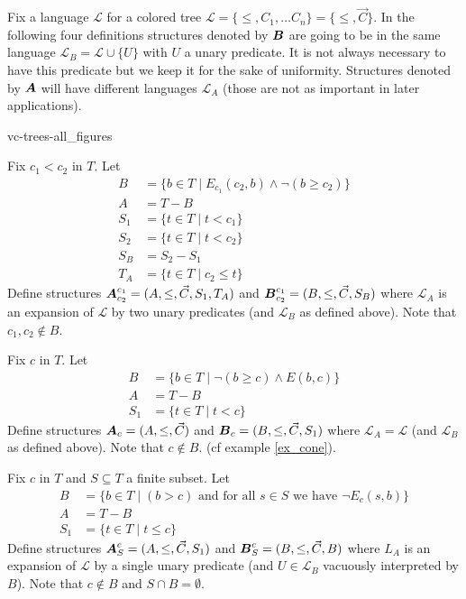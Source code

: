 \documentclass{amsart}
\DeclareMathOperator{\TT}{\boldface T}
\DeclareMathOperator{\A}{\boldface A}
\DeclareMathOperator{\B}{\boldface B}
\renewcommand{\LL}{\mathcal L}
\begin{document}
Fix a language $\LL$ for a colored tree $\LL = \{\leq, C_1, \ldots C_n\} = \{\leq, \vec C\}$.
In the following four definitions structures denoted by $\B$ are going to be in the same language $\LL_B = \LL \cup \{U\}$ with $U$ a unary predicate.
It is not always necessary to have this predicate but we keep it for the sake of uniformity.
Structures denoted by $\A$ will have different languages $\LL_A$ (those are not as important in later applications).

 {vc-trees-all_figures}

\begin{Definition}
	Fix $c_1 < c_2$ in $T$. Let
	\begin{align*}
		B &= \{b \in T \mid E_{c_1}(c_2, b) \wedge \neg(b \geq c_2)\} \\
		A &= T - B \\
		S_1 &= \{t \in T \mid t < c_1\} \\
		S_2 &= \{t \in T \mid t < c_2\} \\
		S_B &= S_2 - S_1 \\
		T_A &= \{t \in T \mid c_2 \leq t\}
	\end{align*}
	Define structures $\A^{c_1}_{c_2} = (A, \leq, \vec C, S_1, T_A)$ and $\B^{c_1}_{c_2} = (B, \leq, \vec C, S_B)$ where $\LL_A$ is an expansion of $\LL$ by two unary predicates (and $\LL_B$ as defined above). Note that $c_1, c_2 \notin B$.
\end{Definition}


\begin{Definition}
	Fix $c$ in $T$. Let
	\begin{align*}
		B &= \{b \in T \mid \neg(b \geq c) \wedge E(b,c)\} \\
		A &= T - B \\
		S_1 &= \{t \in T \mid t < c\}
	\end{align*}
	Define structures $\A_{c} = (A, \leq, \vec C)$ and $\B_{c} = (B, \leq, \vec C, S_1)$ where $\LL_A = \LL$ (and $\LL_B$ as defined above). Note that $c \notin B$. (cf example \ref{ex_cone}).
\end{Definition}

\begin{Definition}
	Fix $c$ in $T$ and $S \subseteq T$ a finite subset. Let
	\begin{align*}
		B &= \{b \in T \mid (b > c) \text{ and for all $s \in S$ we have } \neg E_c(s, b)\} \\
		A &= T - B \\
		S_1 &= \{t \in T \mid t \leq c\}
	\end{align*}
	Define structures $\A^{c}_{S} = (A, \leq, \vec C, S_1)$ and $\B^{c}_{S} = (B, \leq, \vec C, B)$ where $L_A$ is an expansion of $\LL$ by a single unary predicate (and $U \in \LL_B$ vacuously interpreted by $B$). Note that $c \notin B$ and $S \cap B = \emptyset$.
\end{Definition}
\end{document}
